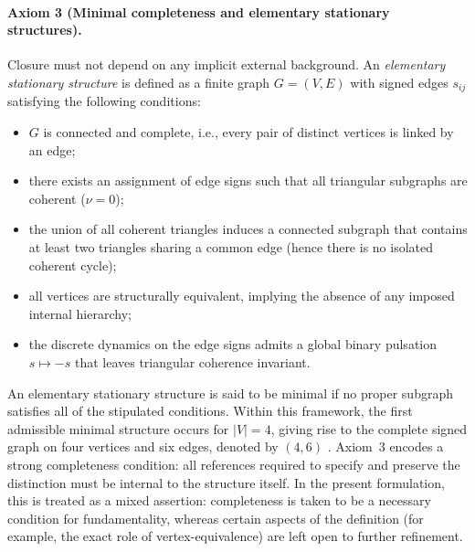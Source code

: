 \documentclass[11pt,a4paper]{article}
\begin{document}
\paragraph{Axiom 3 (Minimal completeness and elementary stationary structures).}
Closure must not depend on any implicit external background. An \emph{elementary stationary structure} is defined as a finite graph \(G = (V,E)\) with signed edges \(s_{ij}\) satisfying the following conditions:
\begin{itemize}
  \item \(G\) is connected and complete, i.e., every pair of distinct vertices is linked by an edge;
  \item there exists an assignment of edge signs such that all triangular subgraphs are coherent (\(\nu = 0\));
  \item the union of all coherent triangles induces a connected subgraph that contains at least two triangles sharing a common edge (hence there is no isolated coherent cycle);
  \item all vertices are structurally equivalent, implying the absence of any imposed internal hierarchy;
  \item the discrete dynamics on the edge signs admits a global binary pulsation \(s \mapsto -s\) that leaves triangular coherence invariant.
\end{itemize}
An elementary stationary structure is said to be minimal if no proper subgraph satisfies all of the stipulated conditions. Within this framework, the first admissible minimal structure occurs for \(|V| = 4\), giving rise to the complete signed graph on four vertices and six edges, denoted by \((4,6)\) \cite{Laubscher_LDP_fr}. Axiom~3 encodes a strong completeness condition: all references required to specify and preserve the distinction must be internal to the structure itself. In the present formulation, this is treated as a mixed assertion: completeness is taken to be a necessary condition for fundamentality, whereas certain aspects of the definition (for example, the exact role of vertex-equivalence) are left open to further refinement.
\end{document}
